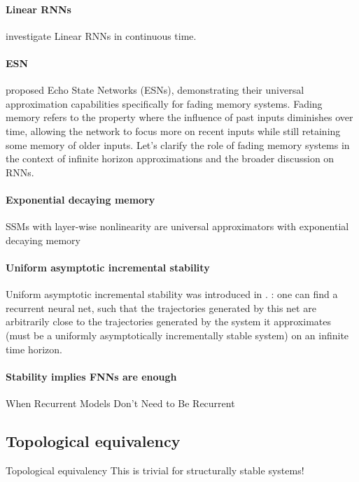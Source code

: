 \documentclass{article}
\theoremstyle{definition}
\theoremstyle{remark}
\begin{document}
\paragraph{Linear RNNs}
\citet{li2020curse} investigate Linear RNNs in continuous time. %
 
 \citep{li2022approximation}

\paragraph{ESN}
 \citet{jaeger2001echo} proposed Echo State Networks (ESNs), demonstrating their universal approximation capabilities specifically for fading memory systems.
Fading memory refers to the property where the influence of past inputs diminishes over time, allowing the network to focus more on recent inputs while still retaining some memory of older inputs.
 Let’s clarify the role of fading memory systems in the context of infinite horizon approximations and the broader discussion on RNNs.
 
 
\paragraph{Exponential decaying memory}%
SSMs with layer-wise nonlinearity are universal approximators with exponential decaying memory \citep{wang2024state}

\citep{dubinin2024fading}

\paragraph{Uniform asymptotic incremental stability}
Uniform asymptotic incremental stability was introduced in \citep{pavlov2006uniform}.
\citep{hanson2020universal}: one can find a recurrent neural net, such that the trajectories generated by this net are arbitrarily close to the trajectories generated by the system it approximates (must be a uniformly asymptotically incrementally stable system) on an infinite time horizon.


\paragraph{Stability implies FNNs are enough}%
When Recurrent Models Don't Need to Be Recurrent \citep{miller2018stable}






\subsection{Topological equivalency}
Topological equivalency \citep{hart2020embedding}
This is trivial for structurally stable systems!
\end{document}
